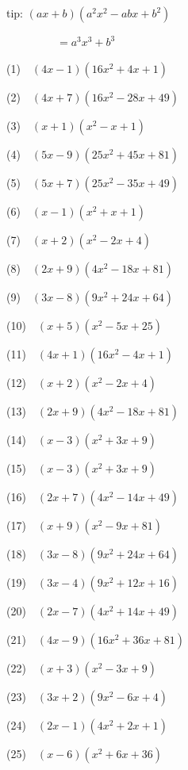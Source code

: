 \documentclass[a4j,twocolumn,10pt,fleqn]{jarticle}
\begin{document}
tip: $\left(a x + b\right) \left(a^{2} x^{2} - a b x + b^{2}\right)$

~~~~~~~~~$=a^{3} x^{3} + b^{3}$


(1)~~$\left(4 x - 1\right) \left(16 x^{2} + 4 x + 1\right)$

(2)~~$\left(4 x + 7\right) \left(16 x^{2} - 28 x + 49\right)$

(3)~~$\left(x + 1\right) \left(x^{2} - x + 1\right)$

(4)~~$\left(5 x - 9\right) \left(25 x^{2} + 45 x + 81\right)$

(5)~~$\left(5 x + 7\right) \left(25 x^{2} - 35 x + 49\right)$

(6)~~$\left(x - 1\right) \left(x^{2} + x + 1\right)$

(7)~~$\left(x + 2\right) \left(x^{2} - 2 x + 4\right)$

(8)~~$\left(2 x + 9\right) \left(4 x^{2} - 18 x + 81\right)$

(9)~~$\left(3 x - 8\right) \left(9 x^{2} + 24 x + 64\right)$

(10)~~$\left(x + 5\right) \left(x^{2} - 5 x + 25\right)$

(11)~~$\left(4 x + 1\right) \left(16 x^{2} - 4 x + 1\right)$

(12)~~$\left(x + 2\right) \left(x^{2} - 2 x + 4\right)$

(13)~~$\left(2 x + 9\right) \left(4 x^{2} - 18 x + 81\right)$

(14)~~$\left(x - 3\right) \left(x^{2} + 3 x + 9\right)$

(15)~~$\left(x - 3\right) \left(x^{2} + 3 x + 9\right)$

(16)~~$\left(2 x + 7\right) \left(4 x^{2} - 14 x + 49\right)$

(17)~~$\left(x + 9\right) \left(x^{2} - 9 x + 81\right)$

(18)~~$\left(3 x - 8\right) \left(9 x^{2} + 24 x + 64\right)$

(19)~~$\left(3 x - 4\right) \left(9 x^{2} + 12 x + 16\right)$

(20)~~$\left(2 x - 7\right) \left(4 x^{2} + 14 x + 49\right)$

(21)~~$\left(4 x - 9\right) \left(16 x^{2} + 36 x + 81\right)$

(22)~~$\left(x + 3\right) \left(x^{2} - 3 x + 9\right)$

(23)~~$\left(3 x + 2\right) \left(9 x^{2} - 6 x + 4\right)$

(24)~~$\left(2 x - 1\right) \left(4 x^{2} + 2 x + 1\right)$

(25)~~$\left(x - 6\right) \left(x^{2} + 6 x + 36\right)$
\end{document}
